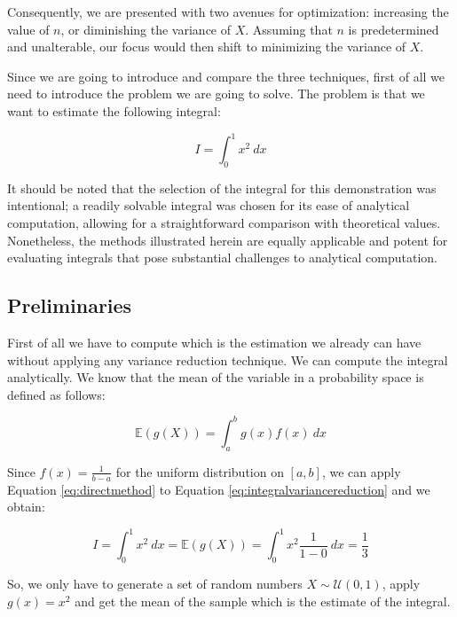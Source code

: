 \documentclass{report}
\begin{document}
Consequently, we are presented with two avenues for optimization: increasing the value of \(n\), or diminishing the variance of \(X\). Assuming that \(n\) is predetermined and unalterable, our focus would then shift to minimizing the variance of \(X\).

Since we are going to introduce and compare the three techniques, first of all we need to introduce the problem we are going to solve. The problem is that we want to estimate the following integral:

\begin{equation} \label{eq:integralvariancereduction} I = \int_{0}^{1} x^2 \ dx \end{equation}

It should be noted that the selection of the integral for this demonstration was intentional; a readily solvable integral was chosen for its ease of analytical computation, allowing for a straightforward comparison with theoretical values. Nonetheless, the methods illustrated herein are equally applicable and potent for evaluating integrals that pose substantial challenges to analytical computation.

\subsection{Preliminaries}
\label{sec:variance_reduction_preliminaries}

First of all we have to compute which is the estimation we already can have without applying any variance reduction technique. We can compute the integral analytically. We know that the mean of the variable in a probability space is defined as follows:

\begin{equation} 
	\label{eq:directmethod} 
	\mathbb{E}(g(X)) = \int_a^b g(x)f(x) \ dx
\end{equation}

Since \(f(x) = \frac{1}{b-a}\) for the uniform distribution on \([a,b]\), we can apply Equation \eqref{eq:directmethod} to Equation \eqref{eq:integralvariancereduction} and we obtain:

\begin{equation} \label{eq:directmethodintegral} I = \int_{0}^{1} x^2 \ dx = \mathbb{E}(g(X)) = \int_0^1 x^2 \frac{1}{1-0} \ dx = \frac{1}{3} \end{equation}

So, we only have to generate a set of random numbers \(X \sim \mathcal{U}(0,1)\), apply \(g(x) = x^2\) and get the mean of the sample which is the estimate of the integral.
\end{document}
